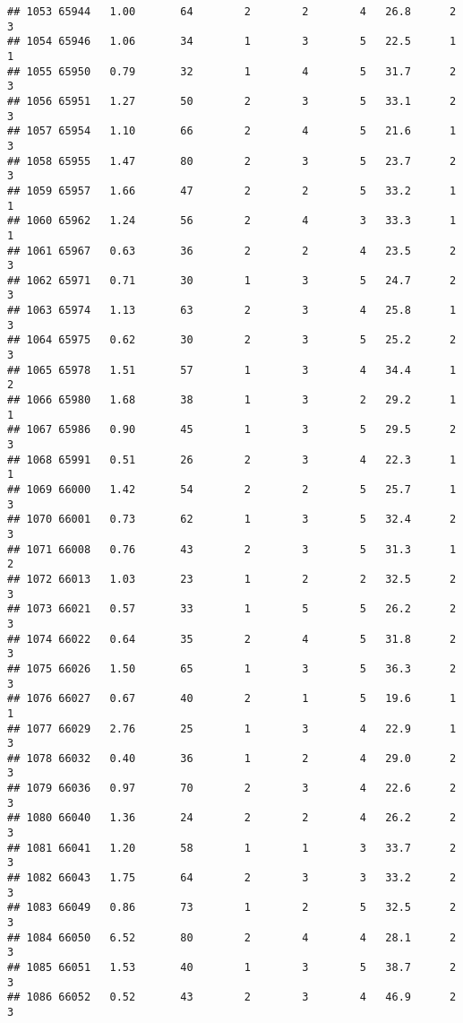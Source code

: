\documentclass[
]{article}
\begin{document}
\begin{verbatim}
## 1053 65944   1.00       64        2        2        4   26.8      2      3
## 1054 65946   1.06       34        1        3        5   22.5      1      1
## 1055 65950   0.79       32        1        4        5   31.7      2      3
## 1056 65951   1.27       50        2        3        5   33.1      2      3
## 1057 65954   1.10       66        2        4        5   21.6      1      3
## 1058 65955   1.47       80        2        3        5   23.7      2      3
## 1059 65957   1.66       47        2        2        5   33.2      1      1
## 1060 65962   1.24       56        2        4        3   33.3      1      1
## 1061 65967   0.63       36        2        2        4   23.5      2      3
## 1062 65971   0.71       30        1        3        5   24.7      2      3
## 1063 65974   1.13       63        2        3        4   25.8      1      3
## 1064 65975   0.62       30        2        3        5   25.2      2      3
## 1065 65978   1.51       57        1        3        4   34.4      1      2
## 1066 65980   1.68       38        1        3        2   29.2      1      1
## 1067 65986   0.90       45        1        3        5   29.5      2      3
## 1068 65991   0.51       26        2        3        4   22.3      1      1
## 1069 66000   1.42       54        2        2        5   25.7      1      3
## 1070 66001   0.73       62        1        3        5   32.4      2      3
## 1071 66008   0.76       43        2        3        5   31.3      1      2
## 1072 66013   1.03       23        1        2        2   32.5      2      3
## 1073 66021   0.57       33        1        5        5   26.2      2      3
## 1074 66022   0.64       35        2        4        5   31.8      2      3
## 1075 66026   1.50       65        1        3        5   36.3      2      3
## 1076 66027   0.67       40        2        1        5   19.6      1      1
## 1077 66029   2.76       25        1        3        4   22.9      1      3
## 1078 66032   0.40       36        1        2        4   29.0      2      3
## 1079 66036   0.97       70        2        3        4   22.6      2      3
## 1080 66040   1.36       24        2        2        4   26.2      2      3
## 1081 66041   1.20       58        1        1        3   33.7      2      3
## 1082 66043   1.75       64        2        3        3   33.2      2      3
## 1083 66049   0.86       73        1        2        5   32.5      2      3
## 1084 66050   6.52       80        2        4        4   28.1      2      3
## 1085 66051   1.53       40        1        3        5   38.7      2      3
## 1086 66052   0.52       43        2        3        4   46.9      2      3

\end{verbatim}
\end{document}
